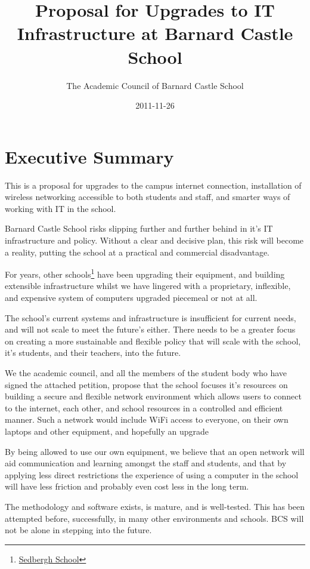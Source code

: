 \documentclass[a4paper,leqno,titlepage]{article}
\title{Proposal for Upgrades to IT Infrastructure at Barnard Castle School}
\author{The Academic Council of Barnard Castle School}
\date{2011-11-26}
\begin{document}
\maketitle

\section{Executive Summary}

This is a proposal for upgrades to the campus internet connection,
installation of wireless networking accessible to both students and staff,
and smarter ways of working with IT in the school. 

Barnard Castle School risks slipping further and further behind in it's
IT infrastructure and policy.
Without a clear and decisive plan, this risk will become a reality, putting
the school at a practical and commercial disadvantage.


For years, other schools\footnote{\href{http://www.sedberghschool.org/ict.html}{Sedbergh School}} 
have been upgrading their equipment, and building extensible infrastructure
whilst we have lingered with a proprietary, inflexible, and expensive system of
computers upgraded piecemeal or not at all.


The school's current systems and infrastructure is insufficient for current
needs, and will not scale to meet the future's either.
There needs to be a greater focus on creating a more sustainable and flexible
policy that will scale with the school, it's students, and their teachers, into
the future.


We the academic council, and all the members of the student body who have signed
the attached petition, propose that the school focuses it's resources on building
a secure and flexible network environment which allows users to connect to the
internet, each other, and school resources in a controlled and efficient manner.
Such a network would include WiFi access to everyone, on their own laptops and
other equipment, and hopefully an upgrade 


By being allowed to use our own equipment, we believe that an open network will
aid communication and learning amongst the staff and students, and that by
applying less direct restrictions the experience of using a computer in the
school will have less friction and probably even cost less in the long term.


The methodology and software exists, is mature, and is well-tested. This has been
attempted before, successfully, in many other environments and schools. BCS will
not be alone in stepping into the future.
\end{document}
